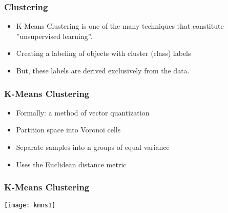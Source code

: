 \begin{frame}[fragile]\frametitle{Clustering}
\begin{itemize}
\item K-Means Clustering is one of the many techniques that constitute ''unsupervised learning''.
\item Creating a labeling of objects with cluster (class) labels
\item But, these labels are derived exclusively from the data.
\end{itemize}
\end{frame}

\begin{frame}[fragile]\frametitle{K-Means Clustering}
\begin{itemize}
\item Formally: a method of vector quantization
\item Partition space into Voronoi cells
\item Separate samples into n groups of equal variance
\item Uses the Euclidean distance metric
\end{itemize}
\end{frame}

\begin{frame}[fragile]\frametitle{K-Means Clustering}
\begin{center}
\texttt{[image: kmns1]}
\end{center}
\end{frame}

